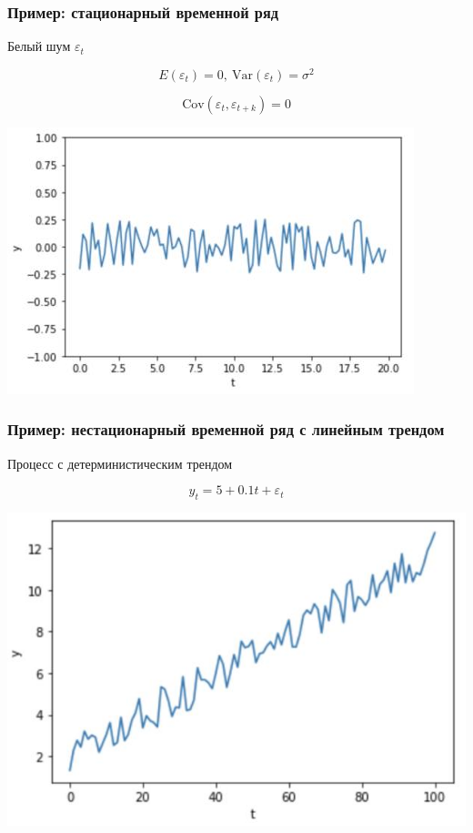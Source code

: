 \documentclass[fullscreen=true, bookmarks=true, hyperref={pdfencoding=unicode}]{beamer}
\begin{document}
\begin{frame}
  \frametitle{Пример: стационарный временной ряд}

  Белый шум $\varepsilon_t$

  $$ E(\varepsilon_t) = 0,\ \text{Var}(\varepsilon_t) = \sigma^2$$

  $$ \text{Cov}(\varepsilon_t, \varepsilon_{t+k}) = 0 $$

  \begin{center}
    \includegraphics[keepaspectratio,
                     width=.7\paperwidth]{stationary.jpg}
  \end{center}
\end{frame}


\begin{frame}
  \frametitle{Пример: нестационарный временной ряд с линейным трендом}

  Процесс с детерминистическим трендом

  $$ y_t = 5 + 0.1t + \varepsilon_t $$

  \begin{center}
    \includegraphics[keepaspectratio,
                     width=.7\paperwidth]{lin_unstationary.jpg}
  \end{center}
 \end{frame}
\end{document}
